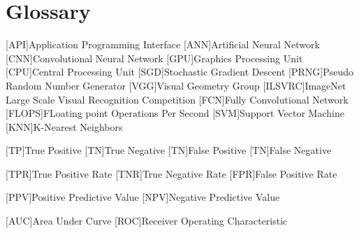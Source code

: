 \chapter{Glossary}

\footnotesize
\SingleSpacing

\begin{multicols}{2}
\begin{acronym}[AAAAAA]

	[API]{Application Programming Interface}
	[ANN]{Artificial Neural Network}
	[CNN]{Convolutional Neural Network}
	[GPU]{Graphics Processing Unit}
	[CPU]{Central Processing Unit}
	[SGD]{Stochastic Gradient Descent}
	[PRNG]{Pseudo Random Number Generator}
	[VGG]{Visual Geometry Group}
    [ILSVRC]{ImageNet Large Scale Visual Recognition Competition}
    [FCN]{Fully Convolutional Network}
    [FLOPS]{FLoating point Operations Per Second}
    [SVM]{Support Vector Machine}
    [KNN]{K-Nearest Neighbors}

    [TP]{True Positive}
    [TN]{True Negative}
    [TN]{False Positive}
    [TN]{False Negative}

    [TPR]{True Positive Rate}
    [TNR]{True Negative Rate}
    [FPR]{False Positive Rate}

    [PPV]{Positive Predictive Value}
    [NPV]{Negative Predictive Value}

    [AUC]{Area Under Curve}
    [ROC]{Receiver Operating Characteristic}

\end{acronym}
\end{multicols}
